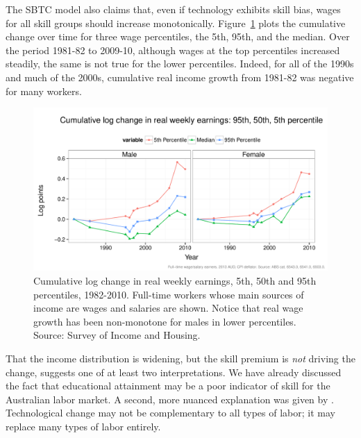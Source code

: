 The SBTC model also claims that, even if technology exhibits skill bias, wages for all skill groups should increase monotonically. Figure~\ref{fig:changetime} plots the cumulative change over time for three wage percentiles, the 5th, 95th, and the median. Over the period 1981-82 to 2009-10, although wages at the top percentiles increased steadily, the same is not true for the lower percentiles. Indeed, for all of the 1990s and much of the 2000s, cumulative real income growth from 1981-82 was negative for many workers.
\begin{figure}
  \centering
  \includegraphics[width=\textwidth]{../figure/wage_change_time.pdf}
  \caption{Cumulative log change in real weekly earnings, 5th, 50th and 95th percentiles, 1982-2010. Full-time workers whose main sources of income are wages and salaries are shown. Notice that real wage growth has been non-monotone for males in lower percentiles. Source: Survey of Income and Housing.}
  \label{fig:changetime}
\end{figure}

That the income distribution is widening, but the skill premium is {\em not} driving the change, suggests one of at least two interpretations. We have already discussed the fact that educational attainment may be a poor indicator of skill for the Australian labor market. A second, more nuanced explanation was given by \citet{Levy2003}. Technological change may not be complementary to all types of labor; it may replace many types of labor entirely.





